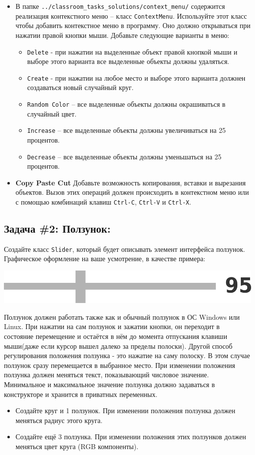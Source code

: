 \documentclass{article}
\begin{document}
\begin{itemize}
\item В папке \texttt{../classroom\_tasks\_solutions/context\_menu/} содержится реализация контекстного меню -- класс \texttt{ContextMenu}. Используйте этот класс чтобы добавить контекстное меню в программу. Оно должно открываться при нажатии правой кнопки мыши. Добавьте следующие варианты в меню:
\begin{itemize}
\item \texttt{Delete} - при нажатии на выделенные объект правой кнопкой мыши и выборе этого варианта все выделенные объекты должны удаляться.
\item \texttt{Create} - при нажатии на любое место и выборе этого варианта должнен создаваться новый случайный круг.
\item \texttt{Random Color} -- все выделенные объекты должны окрашиваться в случайный цвет.
\item \texttt{Increase} -- все выделенные объекты должны увеличиваться на 25 процентов.
\item \texttt{Decrease} -- все выделенные объекты должны уменьшаться на 25 процентов.
\end{itemize}

\item \textbf{Copy Paste Cut} Добавьте возможность копирования, вставки и вырезания объектов. Вызов этих операций должен происходить в контекстном меню или с помощью комбинаций клавиш \texttt{Ctrl-C}, \texttt{Ctrl-V} и \texttt{Ctrl-X}.

\end{itemize}

	
\subsection*{Задача \#2: Ползунок:} 
Создайте класс \texttt{Slider}, который будет описывать элемент интерфейса ползунок. Графическое оформление на ваше усмотрение, в качестве примера:
\begin{center}
\includegraphics[scale=0.6]{../images/slider.png}
\end{center}
Ползунок должен работать также как и обычный ползунок в ОС Windows или Linux. При нажатии на сам ползунок и зажатии кнопки, он переходит в состояние перемещение и остаётся в нём до момента отпускания клавиши мыши(даже если курсор вышел далеко за пределы полоски). Другой способ регулирования положения ползунка - это нажатие на саму полоску. В этом случае ползунок сразу перемещается в выбранное место. При изменении положения ползунка должен меняться текст, показывающий числовое значение. Минимальное и максимальное значение ползунка должно задаваться в конструкторе и хранится в приватных переменных.
\begin{itemize}
\item Создайте круг и 1 ползунок. При изменении положения ползунка должен меняться радиус этого круга.
\item Создайте ещё 3 ползунка. При изменении положения этих ползунков должен меняться цвет круга (RGB компоненты).
\end{itemize}
\end{document}
